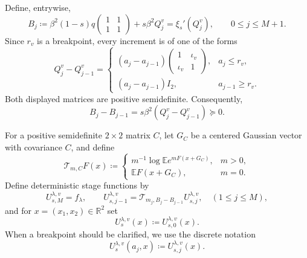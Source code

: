\documentclass[11pt]{article}
\numberwithin{equation}{section}
\newcommand{\E}{\mathbb{E}}
\newcommand{\1}{\mathbf 1}
\begin{document}
Define, entrywise,
\begin{equation}
 B_j\coloneqq\beta^2(1-s)q
 \begin{pmatrix}1&1\\1&1\end{pmatrix}
 +s\beta^2Q_j^v
 =\xi_s'(Q_j^v),
 \qquad 0\le j\le M+1.
\end{equation}
Since $r_v$ is a breakpoint, every increment is of one of the forms
\begin{equation}
 Q_j^v-Q_{j-1}^v=
 \begin{cases}
 (a_j-a_{j-1})
 \begin{pmatrix}1&\iota_v\\\iota_v&1\end{pmatrix},&a_j\le r_v,\\[3mm]
 (a_j-a_{j-1})I_2,&a_{j-1}\ge r_v.
 \end{cases}
 \label{eq:GT-overlap-increments}
\end{equation}
Both displayed matrices are positive semidefinite.  Consequently,
\begin{equation}\label{eq:finite-step-vector-increments}
 B_j-B_{j-1}=s\beta^2(Q_j^v-Q_{j-1}^v)\succeq0.
\end{equation}

For a positive semidefinite $2\times2$ matrix $C$, let $G_C$ be a
centered Gaussian vector with covariance $C$, and define
\begin{equation}
 \mathcal T_{m,C}F(x)\coloneqq
 \begin{cases}
 m^{-1}\log\E e^{mF(x+G_C)},&m>0,\\[2mm]
 \E F(x+G_C),&m=0.
 \end{cases}
 \label{eq:GTsemigroup}
\end{equation}
Define deterministic stage functions by
\begin{equation}
 U_{s,M}^{\lambda,v}=f_\lambda,
 \qquad
 U_{s,j-1}^{\lambda,v}
 =\mathcal T_{m_j,B_j-B_{j-1}}U_{s,j}^{\lambda,v},
 \quad ( 1\le j \le M),
 \label{eq:U-stage-recursion}
\end{equation}
and for $x=(x_1,x_2) \in {\mathbb R}^2$ set
\begin{equation}
 U_s^{\lambda,v}(x)\coloneqq U_{s,0}^{\lambda,v}(x).
\end{equation}
When a breakpoint should be clarified, we use the discrete notation
\[
 U_s^{\lambda,v}(a_j,x)\coloneqq U_{s,j}^{\lambda,v}(x).
\]
\end{document}
